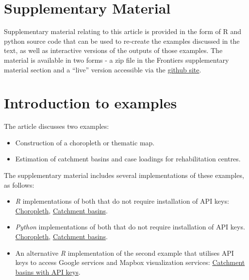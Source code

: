 \documentclass[utf8]{frontiers_suppmat} %
\begin{document}
\onecolumn
{}

\title[Supplementary Material]{{}}


\maketitle


\section{Supplementary Material}

Supplementary material relating to this article is provided in the form
of R and python source code that can be used to re-create the examples
discussed in the text, as well as interactive versions of the outputs of
those examples. The material is available in two forms - a zip file in the
Frontiers supplementary material section and a ``live'' version accessible
via the \href{https://github.com/SymbolixAu/Geospatial}{github site}.  

\section{Introduction to examples}

The article discusses two examples: 
\begin{itemize}
\item Construction of a choropleth or thematic map.
\item Estimation of catchment basins and case loadings for rehabilitation centres.
\end{itemize}

The supplementary material includes several implementations of these examples, as follows:

\begin{itemize}
\item {\em R} implementations of both that do not require installation of API keys: \href{https://geospatial.symbolixAU.io/}{Choropleth}, \href{https://geospatial.symbolixAU.io/}{Catchment basins}.
\item {\em Python} implementations of both that do not require installation of API keys. \href{https://geospatial.symbolixAU.io/}{Choropleth}, \href{https://geospatial.symbolixAU.io/}{Catchment basins}.
\item An alternative {\em R} implementation of the second example that utilises API keys to access Google services and Mapbox visualization services: \href{https://geospatial.symbolixAU.io/}{Catchment basins with API keys}.
\end{itemize}
\end{document}
